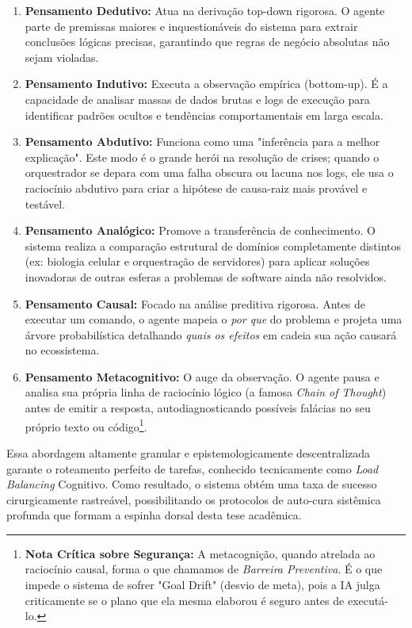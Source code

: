 \begin{enumerate}
\item \textbf{Pensamento Dedutivo:} Atua na derivação top-down rigorosa. O agente parte de premissas maiores e inquestionáveis do sistema para extrair conclusões lógicas precisas, garantindo que regras de negócio absolutas não sejam violadas.
\item \textbf{Pensamento Indutivo:} Executa a observação empírica (bottom-up). É a capacidade de analisar massas de dados brutas e logs de execução para identificar padrões ocultos e tendências comportamentais em larga escala.
\item \textbf{Pensamento Abdutivo:} Funciona como uma "inferência para a melhor explicação". Este modo é o grande herói na resolução de crises; quando o orquestrador se depara com uma falha obscura ou lacuna nos logs, ele usa o raciocínio abdutivo para criar a hipótese de causa-raiz mais provável e testável.
\item \textbf{Pensamento Analógico:} Promove a transferência de conhecimento. O sistema realiza a comparação estrutural de domínios completamente distintos (ex: biologia celular e orquestração de servidores) para aplicar soluções inovadoras de outras esferas a problemas de software ainda não resolvidos.
\item \textbf{Pensamento Causal:} Focado na análise preditiva rigorosa. Antes de executar um comando, o agente mapeia o \emph{por que} do problema e projeta uma árvore probabilística detalhando \emph{quais os efeitos} em cadeia sua ação causará no ecossistema.
\item \textbf{Pensamento Metacognitivo:} O auge da observação. O agente pausa e analisa sua própria linha de raciocínio lógico (a famosa \emph{Chain of Thought}) antes de emitir a resposta, autodiagnosticando possíveis falácias no seu próprio texto ou código\footnote{\textbf{Nota Crítica sobre Segurança:} A metacognição, quando atrelada ao raciocínio causal, forma o que chamamos de \emph{Barreira Preventiva}. É o que impede o sistema de sofrer "Goal Drift" (desvio de meta), pois a IA julga criticamente se o plano que ela mesma elaborou é seguro antes de executá-lo.}.
\end{enumerate}

Essa abordagem altamente granular e epistemologicamente descentralizada garante o roteamento perfeito de tarefas, conhecido tecnicamente como \emph{Load Balancing} Cognitivo. Como resultado, o sistema obtém uma taxa de sucesso cirurgicamente rastreável, possibilitando os protocolos de auto-cura sistêmica profunda que formam a espinha dorsal desta tese acadêmica.

